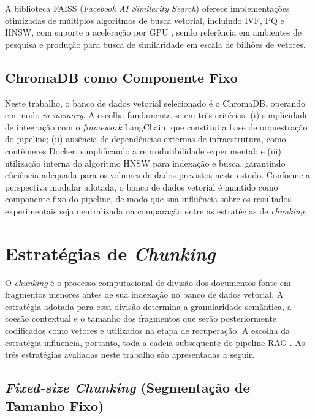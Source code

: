 \documentclass[
	12pt,				%
	openright,			%
	oneside,			%
	a4paper,			%
	tccpreliminar,		%
	]{ABNT-DC-UEL}
\begin{document}
A biblioteca FAISS (\textit{Facebook AI Similarity Search}) oferece implementações otimizadas de múltiplos algoritmos de busca vetorial, incluindo IVF, PQ e HNSW, com suporte a aceleração por GPU \cite{johnson2019faiss}, sendo referência em ambientes de pesquisa e produção para busca de similaridade em escala de bilhões de vetores.

\subsection{ChromaDB como Componente Fixo}

Neste trabalho, o banco de dados vetorial selecionado é o ChromaDB, operando em modo \textit{in-memory}. A escolha fundamenta-se em três critérios: (i) simplicidade de integração com o \textit{framework} LangChain, que constitui a base de orquestração do pipeline; (ii) ausência de dependências externas de infraestrutura, como contêineres Docker, simplificando a reprodutibilidade experimental; e (iii) utilização interna do algoritmo HNSW para indexação e busca, garantindo eficiência adequada para os volumes de dados previstos neste estudo. Conforme a perspectiva modular adotada, o banco de dados vetorial é mantido como componente fixo do pipeline, de modo que sua influência sobre os resultados experimentais seja neutralizada na comparação entre as estratégias de \textit{chunking}.


\section{Estratégias de \textit{Chunking}}
\label{sec:chunking}

O \textit{chunking} é o processo computacional de divisão dos documentos-fonte em fragmentos menores antes de sua indexação no banco de dados vetorial. A estratégia adotada para essa divisão determina a granularidade semântica, a coesão contextual e o tamanho dos fragmentos que serão posteriormente codificados como vetores e utilizados na etapa de recuperação. A escolha da estratégia influencia, portanto, toda a cadeia subsequente do pipeline RAG \cite{finardi2024chronicles, wang2024bestpractices}. As três estratégias avaliadas neste trabalho são apresentadas a seguir.

\subsection{\textit{Fixed-size Chunking} (Segmentação de Tamanho Fixo)}
\end{document}
